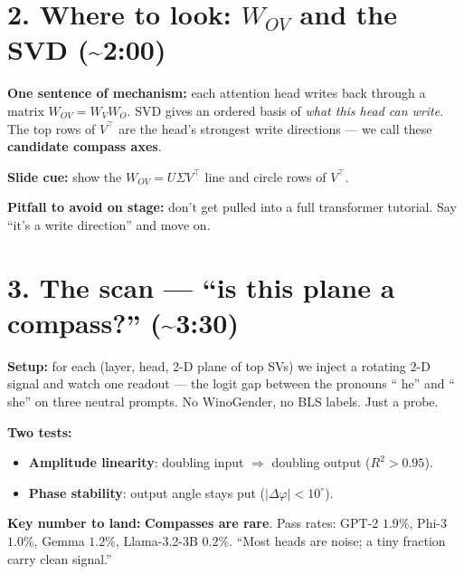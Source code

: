 \documentclass[11pt]{article}
\begin{document}
\section*{2. Where to look: $W_{OV}$ and the SVD (\textasciitilde 2:00)}
\begin{tcolorbox}[beat]
\textbf{One sentence of mechanism:} each attention head writes back through a
matrix $W_{OV} = W_V W_O$. SVD gives an ordered basis of \emph{what this head
can write}. The top rows of $V^\top$ are the head's strongest write
directions --- we call these \textbf{candidate compass axes}.

\textbf{Slide cue:} show the $W_{OV} = U\Sigma V^\top$ line and circle rows
of $V^\top$.

\textbf{Pitfall to avoid on stage:} don't get pulled into a full transformer
tutorial. Say ``it's a write direction'' and move on.
\end{tcolorbox}

\section*{3. The scan --- ``is this plane a compass?'' (\textasciitilde 3:30)}
\begin{tcolorbox}[beat]
\textbf{Setup:} for each (layer, head, 2-D plane of top SVs) we inject a
rotating 2-D signal and watch one readout --- the logit gap between the
pronouns `` he'' and `` she'' on three neutral prompts. No WinoGender,
no BLS labels. Just a probe.

\textbf{Two tests:}
\begin{itemize}
  \item \textbf{Amplitude linearity}: doubling input $\Rightarrow$ doubling output ($R^2 > 0.95$).
  \item \textbf{Phase stability}: output angle stays put ($|\Delta\varphi| < 10^\circ$).
\end{itemize}

\textbf{Key number to land:} \textbf{Compasses are rare}. Pass rates:
GPT-2 $1.9\%$, Phi-3 $1.0\%$, Gemma $1.2\%$, Llama-3.2-3B $0.2\%$.
``Most heads are noise; a tiny fraction carry clean signal.''
\end{tcolorbox}

\end{document}

